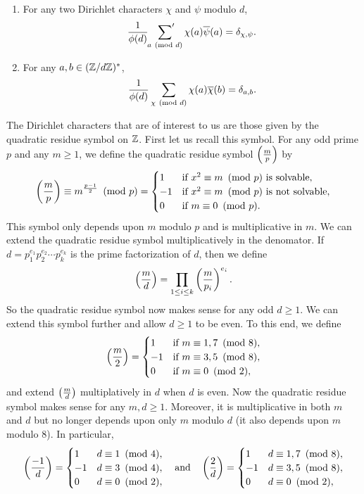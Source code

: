 \documentclass[12pt,reqno,oneside]{amsart}
\begin{document}
    \begin{theorem}
        \phantom{ }
        \begin{enumerate}[label=(\roman*)]
          \item For any two Dirichlet characters $\chi$ and $\psi$ modulo $d$,
          \[
            \frac{1}{\phi(d)}\sideset{}{'}\sum_{a \ \left(\text{mod }d\right)}\chi(a)\overline{\psi}(a) = \delta_{\chi,\psi}.
          \]
          \item For any $a,b \in (\mathbb{Z}/d\mathbb{Z})^{\ast}$,
          \[
            \frac{1}{\phi(d)}\sum_{\chi \ \left(\text{mod }d\right)}\chi(a)\overline{\chi}(b) = \delta_{a,b}.
          \]
        \end{enumerate}
    \end{theorem}

    The Dirichlet characters that are of interest to us are those given by the quadratic residue symbol on $\mathbb{Z}$. First let us recall this symbol. For any odd prime $p$ and any $m \ge 1$, we define the quadratic residue symbol $\textstyle{\left(\frac{m}{p}\right)}$ by
    \[
        \left(\frac{m}{p}\right) \equiv m^{\frac{p-1}{2}} \ \left(\text{mod }p\right) = \begin{cases} 1 & \text{if $x^{2} \equiv m \ \left(\text{mod }p\right)$ is solvable}, \\ -1 & \text{if $x^{2} \equiv m \ \left(\text{mod }p\right)$ is not solvable}, \\ 0 & \text{if $m \equiv 0 \ \left(\text{mod }p\right)$}. \end{cases}
    \]
    This symbol only depends upon $m$ modulo $p$ and is multiplicative in $m$. We can extend the quadratic residue symbol multiplicatively in the denomator. If $d = p_{1}^{e_{1}}p_{2}^{e_{2}} \cdots p_{k}^{e_{k}}$ is the prime factorization of $d$, then we define
    \[
        \left(\frac{m}{d}\right) = \prod_{1 \le i \le k}\left(\frac{m}{p_{i}}\right)^{e_{i}}.
    \]
    So the quadratic residue symbol now makes sense for any odd $d \ge 1$. We can extend this symbol further and allow $d \ge 1$ to be even. To this end, we define
    \[
        \left(\frac{m}{2}\right) = \begin{cases} 1 & \text{if $m \equiv 1,7 \ \left(\text{mod }8\right)$}, \\ -1 & \text{if $m \equiv 3,5 \ \left(\text{mod }8\right)$}, \\ 0 & \text{if $m \equiv 0 \ \left(\text{mod }2\right)$}, \end{cases}
    \]
    and extend $\textstyle{\left(\frac{m}{d}\right)}$ multiplatively in $d$ when $d$ is even. Now the quadratic residue symbol makes sense for any $m,d \ge 1$. Moreover, it is multiplicative in both $m$ and $d$ but no longer depends upon only $m$ modulo $d$ (it also depends upon $m$ modulo $8$). In particular,
    \[
        \left(\frac{-1}{d}\right) = \begin{cases} 1 & \text{$d \equiv 1 \ \left(\text{mod }4\right)$}, \\ -1 & \text{$d \equiv 3 \ \left(\text{mod }4\right)$}, \\ 0 & \text{$d \equiv 0 \ \left(\text{mod }2\right)$}, \end{cases} \quad \text{and} \quad \left(\frac{2}{d}\right) = \begin{cases} 1 & \text{$d \equiv 1,7 \ \left(\text{mod }8\right)$}, \\ -1 & \text{$d \equiv 3,5 \ \left(\text{mod }8\right)$}, \\ 0 & \text{$d \equiv 0 \ \left(\text{mod }2\right)$}, \end{cases}
    \]
\end{document}
